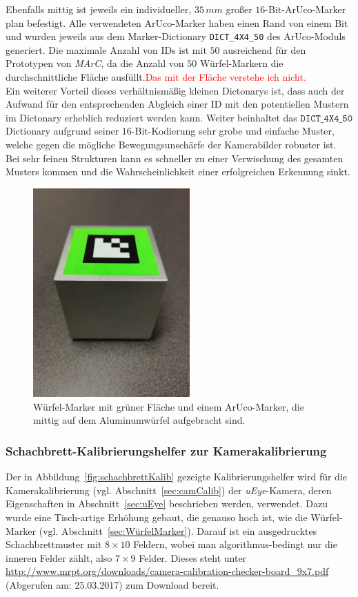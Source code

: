 Ebenfalls mittig ist jeweils ein individueller, $35\,mm$ großer $16$-Bit-ArUco-Marker plan befestigt. Alle verwendeten ArUco-Marker haben einen Rand von einem Bit und wurden jeweils aus dem Marker-Dictionary \texttt{DICT\_4X4\_50} des ArUco-Moduls \cite{website:ArucoDoc} generiert. Die maximale Anzahl von IDs ist mit $50$ ausreichend für den Prototypen von \textit{MArC}, da die Anzahl von $50$ Würfel-Markern die durchschnittliche Fläche ausfüllt.\textcolor{red}{Das mit der Fläche verstehe ich nicht.}\\ 
Ein weiterer Vorteil dieses verhältnismäßig kleinen Dictonarys ist, dass auch der Aufwand für den entsprechenden Abgleich einer ID mit den potentiellen Mustern im Dictonary erheblich reduziert werden kann. 
Weiter beinhaltet das $\texttt{DICT\_4X4\_50}$ Dictionary aufgrund seiner $16$-Bit-Kodierung sehr grobe und einfache Muster, welche gegen die mögliche Bewegungsunschärfe der Kamerabilder robuster ist. Bei sehr feinen Strukturen kann es schneller zu einer Verwischung des gesamten Musters kommen und die Wahrscheinlichkeit einer erfolgreichen Erkennung sinkt.

\begin{figure}[H] 
	\center 
	\includegraphics[trim = 0mm 280mm 0mm 150mm, clip, width=6cm]{Bilder/tracking-marker.jpg}			
	\caption{Würfel-Marker mit grüner Fläche und einem ArUco-Marker, die mittig auf dem Aluminumwürfel aufgebracht sind.}
	\label{fig:marker}
\end{figure}

\subsubsection{Schachbrett-Kalibrierungshelfer zur Kamerakalibrierung} \label{sec:SchachbrettKalib} 
Der in Abbildung~\ref{fig:schachbrettKalib} gezeigte Kalibrierungshelfer wird für die Kamerakalibrierung (vgl. Abschnitt~\ref{sec:camCalib}) der \textit{uEye}-Kamera, deren Eigenschaften in Abschnitt~\ref{sec:uEye} beschrieben werden, verwendet. Dazu wurde eine Tisch-artige Erhöhung gebaut, die genauso hoch ist, wie die Würfel-Marker (vgl. Abschnitt~\ref{sec:WürfelMarker}). Darauf ist ein ausgedrucktes Schachbrettmuster mit $8\times10$ Feldern, wobei man algorithmus-bedingt nur die inneren Felder zählt, also $7\times9$ Felder. Dieses steht unter \url{http://www.mrpt.org/downloads/camera-calibration-checker-board_9x7.pdf} (Abgerufen am: 25.03.2017) zum Download bereit.

